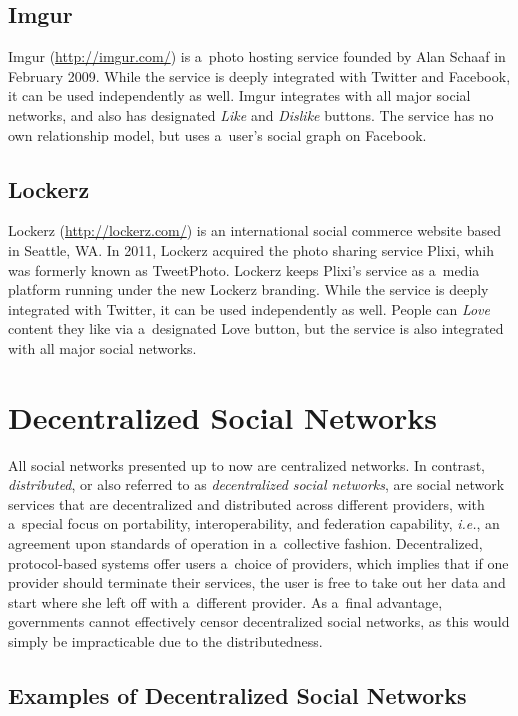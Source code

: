 \subsection{Imgur}

Imgur (\url{http://imgur.com/})
is a~photo hosting service
founded by Alan Schaaf in February 2009.
While the service is deeply integrated with Twitter
and Facebook, it can be used independently as well.
Imgur integrates with all major social networks,
and also has designated \emph{Like} and \emph{Dislike} buttons.
The service has no own relationship model,
but uses a~user's social graph on Facebook.

\subsection{Lockerz}

Lockerz (\url{http://lockerz.com/}) is an international
social commerce website based in Seattle, WA. 
In 2011, Lockerz acquired the photo sharing service Plixi,
whih was formerly known as TweetPhoto.
Lockerz keeps Plixi's service as a~media platform running
under the new Lockerz branding.
While the service is deeply integrated with Twitter,
it can be used independently as well.
People can \emph{Love} content they like via
a~designated Love button,
but the service is also integrated with all major social networks.

\section{Decentralized Social Networks}
All social networks presented up to now are centralized networks.
In contrast, \emph{distributed}, or also referred to as
\emph{decentralized social networks}, are
social network services that are decentralized and distributed
across different providers, with a~special focus on
portability, interoperability, and federation capability,
\emph{i.e.}, an agreement upon standards of operation
in a~collective fashion.
Decentralized, protocol-based systems
offer users a~choice of providers, which implies
that if one provider should terminate their services,
the user is free to take out her data and start
where she left off with a~different provider.
As a~final advantage, governments cannot effectively censor
decentralized social networks,
as this would simply be impracticable due to the distributedness.

\subsection{Examples of Decentralized Social Networks}

